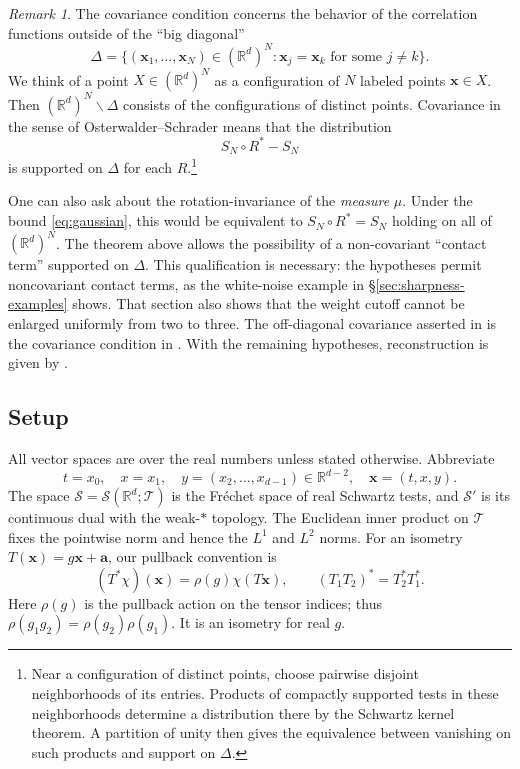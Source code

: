 \documentclass[11pt, letterpaper, reqno]{amsart}
\theoremstyle{definition}
\theoremstyle{remark}
\newtheorem*{remark*}{Remark}
\newcommand{\bbR}{\mathbb{R}}
\newcommand{\calS}{\mathcal{S}}
\newcommand{\calT}{\mathcal{T}}
\newcommand{\bfa}{\mathbf{a}}
\newcommand{\bfx}{\mathbf{x}}
\begin{document}
\begin{remark*}
    The covariance condition concerns the behavior of the correlation functions outside of the ``big diagonal'' 
    \begin{equation}
        \Delta = \{(\bfx_1,\dots,\bfx_N) \in (\bbR^d)^N : \bfx_j=\bfx_k\text{ for some }j\neq k  \}.
    \end{equation}
    We think of a point $X\in (\bbR^d)^N$ as a configuration of $N$ labeled points $\bfx\in X$. Then $(\bbR^d)^N\backslash \Delta$ consists of the configurations of distinct points. 
    Covariance in the sense of Osterwalder--Schrader means that the distribution 
    \begin{equation}
        S_N\circ R^* -S_N
    \end{equation}
    is supported on $\Delta$ for each $R$.\footnote{
    Near a configuration of distinct points, choose pairwise disjoint neighborhoods of its entries. Products of compactly supported tests in these neighborhoods determine a distribution there by the Schwartz kernel theorem. A partition of unity then gives the equivalence between vanishing on such products and support on $\Delta$.
    }

    One can also ask about the rotation-invariance of the \emph{measure} $\mu$. Under the bound \cref{eq:gaussian}, this would be equivalent to $S_N\circ R^*=S_N$ holding on all of $(\bbR^d)^N$. The theorem above allows the possibility of a non-covariant ``contact term'' supported on $\Delta$. 
    This qualification is necessary: the hypotheses permit noncovariant contact terms, as the white-noise example in \S\ref{sec:sharpness-examples} shows. That section also shows that the weight cutoff cannot be enlarged uniformly from two to three. 
    The off-diagonal covariance asserted in  is the covariance condition in \cite[\S3, E1 and Remark~1]{OS}. With the remaining hypotheses, reconstruction is given by \cite[\S IV.1, Theorem $E'$ (or $E''$)$\to R'$]{OS2}. 
\end{remark*}

\subsection{Setup}
\label{subsec:setup}

All vector spaces are over the real numbers unless stated otherwise.
Abbreviate
\begin{equation}
 t=x_0,\quad x=x_1,\quad y=(x_2,\dots,x_{d-1})\in\bbR^{d-2},
 \quad \bfx=(t,x,y).
\end{equation}
The space $\calS=\calS(\bbR^d;\calT)$ is the Fr\'echet space of real
Schwartz tests, and $\calS'$ is its continuous dual with the weak-$*$
topology. The Euclidean inner product on $\calT$ fixes the pointwise norm
and hence the $L^1$ and $L^2$ norms.
For an isometry $T(\bfx)=g\bfx+\bfa$, our pullback convention is
\begin{equation}\label{eq:pullback}
 (T^*\chi)(\bfx)=\rho(g)\chi(T\bfx),\qquad
 (T_1T_2)^*=T_2^*T_1^*.
\end{equation}
Here $\rho(g)$ is the pullback action on the tensor indices; thus
$\rho(g_1g_2)=\rho(g_2)\rho(g_1)$. It is an isometry for real $g$.
\end{document}
